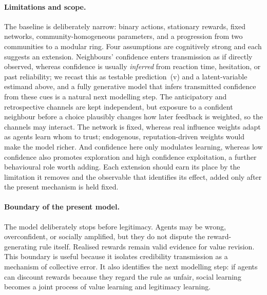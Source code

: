 \documentclass[11pt]{article}
\newcommand{\1}{\mathbf{1}}
\begin{document}
\paragraph{Limitations and scope.}
The baseline is deliberately narrow: binary actions, stationary rewards, fixed
networks, community-homogeneous parameters, and a progression from two
communities to a modular ring. Four assumptions are cognitively strong and each
suggests an extension. Neighbours' confidence enters transmission as if directly
observed, whereas confidence is usually \emph{inferred} from reaction time,
hesitation, or past reliability; we recast this as testable prediction~(v) and a
latent-variable estimand above, and a fully generative model that infers
transmitted confidence from these cues is a natural next modelling step. The anticipatory and
retrospective channels are kept independent, but exposure to a confident
neighbour before a choice plausibly changes how later feedback is weighted, so
the channels may interact. The network is fixed, whereas real influence weights
adapt as agents learn whom to trust; endogenous, reputation-driven weights would
make the model richer. And confidence here only modulates learning, whereas low
confidence also promotes exploration and high confidence exploitation, a further
behavioural role worth adding. Each extension should earn its place by the
limitation it removes and the observable that identifies its effect, added only
after the present mechanism is held fixed.

\paragraph{Boundary of the present model.}
The model deliberately stops before legitimacy. Agents may be wrong,
overconfident, or socially amplified, but they do not dispute the
reward-generating rule itself. Realised rewards remain valid evidence for value
revision. This boundary is useful because it isolates credibility transmission
as a mechanism of collective error. It also identifies the next modelling step:
if agents can discount rewards because they regard the rule as unfair, social
learning becomes a joint process of value learning and legitimacy learning.
\end{document}
